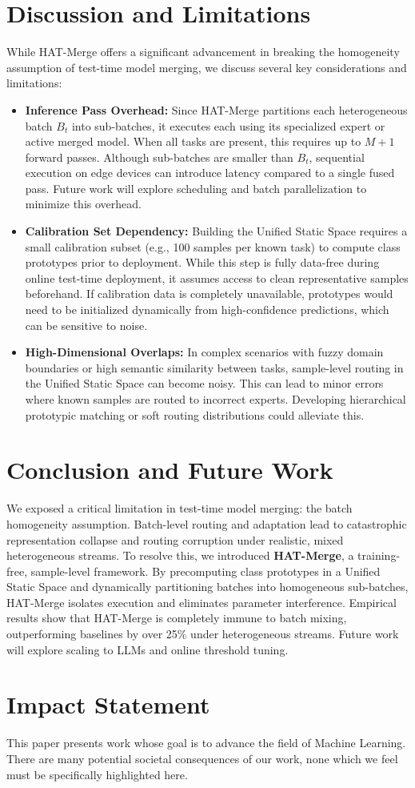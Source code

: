 \documentclass{article}
\theoremstyle{plain}
\theoremstyle{definition}
\theoremstyle{remark}
\begin{document}
\section{Discussion and Limitations}
\label{submission_discussion_limitations}
While HAT-Merge offers a significant advancement in breaking the homogeneity assumption of test-time model merging, we discuss several key considerations and limitations:
\begin{itemize}
    \item \textbf{Inference Pass Overhead:} Since HAT-Merge partitions each heterogeneous batch $B_t$ into sub-batches, it executes each using its specialized expert or active merged model. When all tasks are present, this requires up to $M+1$ forward passes. Although sub-batches are smaller than $B_t$, sequential execution on edge devices can introduce latency compared to a single fused pass. Future work will explore scheduling and batch parallelization to minimize this overhead.
    \item \textbf{Calibration Set Dependency:} Building the Unified Static Space requires a small calibration subset (e.g., 100 samples per known task) to compute class prototypes prior to deployment. While this step is fully data-free during online test-time deployment, it assumes access to clean representative samples beforehand. If calibration data is completely unavailable, prototypes would need to be initialized dynamically from high-confidence predictions, which can be sensitive to noise.
    \item \textbf{High-Dimensional Overlaps:} In complex scenarios with fuzzy domain boundaries or high semantic similarity between tasks, sample-level routing in the Unified Static Space can become noisy. This can lead to minor errors where known samples are routed to incorrect experts. Developing hierarchical prototypic matching or soft routing distributions could alleviate this.
\end{itemize}

\section{Conclusion and Future Work}
\label{submission_conclusion}
We exposed a critical limitation in test-time model merging: the batch homogeneity assumption. Batch-level routing and adaptation lead to catastrophic representation collapse and routing corruption under realistic, mixed heterogeneous streams. To resolve this, we introduced \textbf{HAT-Merge}, a training-free, sample-level framework. By precomputing class prototypes in a Unified Static Space and dynamically partitioning batches into homogeneous sub-batches, HAT-Merge isolates execution and eliminates parameter interference. Empirical results show that HAT-Merge is completely immune to batch mixing, outperforming baselines by over 25\% under heterogeneous streams. Future work will explore scaling to LLMs and online threshold tuning.

\section*{Impact Statement}
This paper presents work whose goal is to advance the field of Machine Learning. There are many potential societal consequences of our work, none which we feel must be specifically highlighted here.



\end{document}
